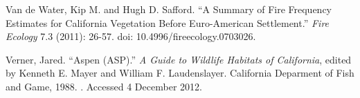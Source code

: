 \begin{hangparas}{.25in}{1}
Van de Water, Kip M. and Hugh D. Safford. ``A Summary of Fire Frequency Estimates for California Vegetation Before Euro-American Settlement.'' \emph{Fire Ecology} 7.3 (2011): 26-57. doi: 10.4996/fireecology.0703026.

Verner, Jared. ``Aspen (ASP).'' \emph{A Guide to Wildlife Habitats of California}, edited by Kenneth E. Mayer and William F. Laudenslayer. California Deparment of Fish and Game, 1988. . Accessed 4 December 2012.

\end{hangparas}

